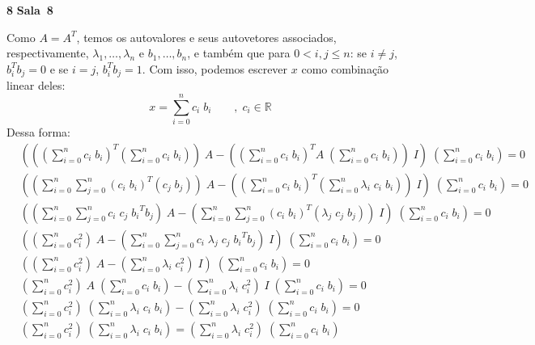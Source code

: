 \documentclass{article}
\newcommand{\R}{\mathbb{R}}
\newcounter{exe-list}
\newenvironment{exe}[2][Sala]
    {\bigskip\noindent\par\ifthenelse{\equal{#1}{}}%
        {\textbf{\LARGE #2}}%
        {\textbf{\LARGE #1~#2}}%
    \medskip\noindent\par}
    {\bigskip}
\begin{document}
\begin{exe}{8}
    Como \(A = A^T\), temos os autovalores e
    seus autovetores associados,
    respectivamente, \(\lambda_1, \dots, \lambda_n\) e
    \(b_1, \dots, b_n\),
    e também que para
    \(0 < i, j \le n\):
    se \(i \ne j\), \(b_i^T b_j = 0\) e
    se \(i = j\), \(b_i^T b_j = 1\).
    Com isso,
    podemos escrever \(x\) como combinação linear deles:
    \[
        x = \sum_{i=0}^n c_i \; b_i
        \qquad,\; c_i \in \R
    \]
    Dessa forma:
    \begin{align*}
        & \left(
                \left(\left(\sum_{i=0}^n c_i \; b_i\right)^T \left(\sum_{i=0}^n c_i \; b_i\right)\right) \; A
                - \left(\left(\sum_{i=0}^n c_i \; b_i\right)^T A \; \left(\sum_{i=0}^n c_i \; b_i\right)\right) \; I
            \right) \; \left(\sum_{i=0}^n c_i \; b_i\right) = 0 \\
        & \left(
                \left(\sum_{i=0}^n \sum_{j=0}^n (c_i \; b_i)^T (c_j \; b_j)\right) \; A
                - \left(\left(\sum_{i=0}^n c_i \; b_i\right)^T \left(\sum_{i=0}^n \lambda_i \; c_i \; b_i\right)\right) \; I
            \right) \; \left(\sum_{i=0}^n c_i \; b_i\right) = 0 \\
        & \left(
                \left(\sum_{i=0}^n \sum_{j=0}^n c_i \; c_j \; {b_i}^T b_j\right) \; A
                - \left(\sum_{i=0}^n \sum_{j=0}^n (c_i \; b_i)^T (\lambda_j \; c_j \; b_j)\right) \; I
            \right) \; \left(\sum_{i=0}^n c_i \; b_i\right) = 0 \\
        & \left(
                \left(\sum_{i=0}^n c_i^2\right) \; A
                - \left(\sum_{i=0}^n \sum_{j=0}^n c_i \; \lambda_j \; c_j \; {b_i}^T b_j\right) \; I
            \right) \; \left(\sum_{i=0}^n c_i \; b_i\right) = 0 \\
        & \left(
                \left(\sum_{i=0}^n c_i^2\right) \; A
                - \left(\sum_{i=0}^n \lambda_i \; c_i^2 \right) \; I
            \right) \; \left(\sum_{i=0}^n c_i \; b_i\right) = 0 \\
        &  \left(\sum_{i=0}^n c_i^2\right) \; A \; \left(\sum_{i=0}^n c_i \; b_i\right)
            - \left(\sum_{i=0}^n \lambda_i \; c_i^2 \right) \; I \; \left(\sum_{i=0}^n c_i \; b_i\right)
            = 0 \\
        &  \left(\sum_{i=0}^n c_i^2\right) \; \left(\sum_{i=0}^n \lambda_i \; c_i \; b_i\right)
            - \left(\sum_{i=0}^n \lambda_i \; c_i^2 \right) \; \left(\sum_{i=0}^n c_i \; b_i\right)
            = 0 \\
        &  \left(\sum_{i=0}^n c_i^2\right) \; \left(\sum_{i=0}^n \lambda_i \; c_i \; b_i\right)
            = \left(\sum_{i=0}^n \lambda_i \; c_i^2 \right) \; \left(\sum_{i=0}^n c_i \; b_i\right)
    \end{align*}
\end{exe}
\end{document}
